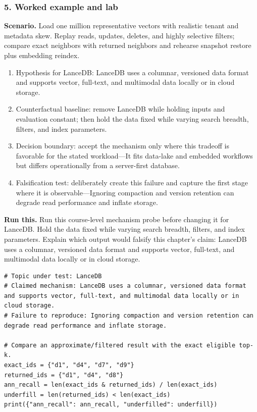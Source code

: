 \subsubsection*{5. Worked example and lab}
\textbf{Scenario.} Load one million representative vectors with realistic tenant and metadata skew. Replay reads, updates, deletes, and highly selective filters; compare exact neighbors with returned neighbors and rehearse snapshot restore plus embedding reindex.
\begin{enumerate}
\item Hypothesis for LanceDB: LanceDB uses a columnar, versioned data format and supports vector, full-text, and multimodal data locally or in cloud storage.
\item Counterfactual baseline: remove LanceDB while holding inputs and evaluation constant; then hold the data fixed while varying search breadth, filters, and index parameters.
\item Decision boundary: accept the mechanism only where this tradeoff is favorable for the stated workload—It fits data-lake and embedded workflows but differs operationally from a server-first database.
\item Falsification test: deliberately create this failure and capture the first stage where it is observable—Ignoring compaction and version retention can degrade read performance and inflate storage.
\end{enumerate}
\textbf{Run this.} Run this course-level mechanism probe before changing it for LanceDB. Hold the data fixed while varying search breadth, filters, and index parameters. Explain which output would falsify this chapter's claim: LanceDB uses a columnar, versioned data format and supports vector, full-text, and multimodal data locally or in cloud storage.
\begin{Verbatim}[fontsize=\scriptsize]
# Topic under test: LanceDB
# Claimed mechanism: LanceDB uses a columnar, versioned data format and supports vector, full-text, and multimodal data locally or in cloud storage.
# Failure to reproduce: Ignoring compaction and version retention can degrade read performance and inflate storage.

# Compare an approximate/filtered result with the exact eligible top-k.
exact_ids = {"d1", "d4", "d7", "d9"}
returned_ids = {"d1", "d4", "d8"}
ann_recall = len(exact_ids & returned_ids) / len(exact_ids)
underfill = len(returned_ids) < len(exact_ids)
print({"ann_recall": ann_recall, "underfilled": underfill})
\end{Verbatim}
